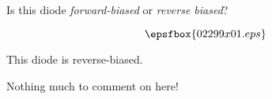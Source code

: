 

Is this diode {\it forward-biased} or {\it reverse biased}?

$$\epsfbox{02299x01.eps}$$







This diode is reverse-biased.







Nothing much to comment on here!




